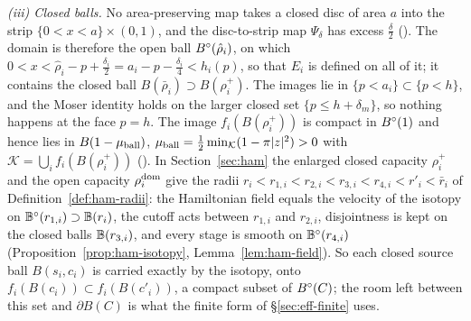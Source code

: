 \emph{(iii) Closed balls.} No area-preserving map takes a closed disc of area $a$ into the strip
$\{0<x<a\}\times(0,1)$, and the disc-to-strip map $\Psi_\delta$ has excess $\frac\delta2$ ().
The domain is therefore the open ball $B^{\circ}(\hat\rho_i)$, on which
$0<x<\hat\rho_i-p+\frac{\delta_i}2=a_i-p-\frac{\delta_i}4<h_i(p)$, so that $E_i$ is defined on all of it; it contains the closed
ball $B(\bar\rho_i)\supset B(\rho_i^+)$. The images lie in $\{p<a_i\}\subset\{p<h\}$, and the Moser identity holds on the
larger closed set $\{p\le h+\delta_m\}$, so nothing happens at the face $p=h$. The image $f_i(B(\rho_i^+))$ is compact in
$B^{\circ}(1)$ and hence lies in $B(1-\mu_{\rm ball})$, $\mu_{\rm ball}=\frac12\min_{\mathcal K}(1-\pi|z|^2)>0$ with $\mathcal K=\bigcup_if_i(B(\rho_i^+))$
(). In Section~\ref{sec:ham} the enlarged closed
capacity $\rho_i^+$ and the open capacity $\rho_i^{\rm dom}$ give the radii $r_i<r_{1,i}<r_{2,i}<r_{3,i}<r_{4,i}<r'_i<\bar r_i$
of Definition~\ref{def:ham-radii}: the Hamiltonian field equals the velocity of the isotopy on $\mathbb{B}^\circ(r_{1,i})\supset\mathbb{B}(r_i)$,
the cutoff acts between $r_{1,i}$ and $r_{2,i}$, disjointness is kept on the closed balls $\mathbb{B}(r_{3,i})$, and every stage is
smooth on $\mathbb{B}^\circ(r_{4,i})$ (Proposition~\ref{prop:ham-isotopy}, Lemma~\ref{lem:ham-field}). So each closed source ball
$B(s_i,c_i)$ is carried exactly by the isotopy, onto $f_i(B(c_i))\subset f_i(B(c'_i))$, a compact subset of $B^{\circ}(C)$; the
room left between this set and $\partial B(C)$ is what the finite form of \S\ref{sec:eff-finite} uses.

